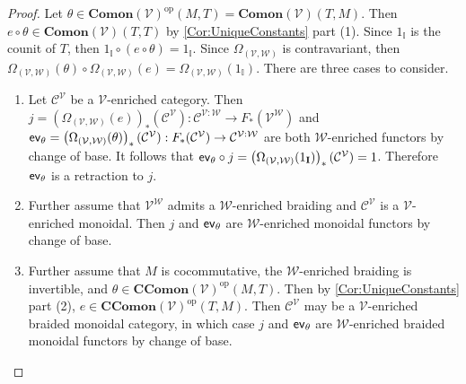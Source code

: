 \begin{proof}
    Let $\theta \in \mathbf{Comon}( \mathcal{V} )^{\text{op}}( M, T ) = \mathbf{Comon}( \mathcal{V} )( T, M )$.
    Then $e \circ \theta \in \mathbf{Comon}( \mathcal{V} )( T, T )$ by \cref{Cor:UniqueConstants} part (1).
    Since $1_{\mathbb{I}}$ is the counit of $T$, then $1_{\mathbb{I}} \circ ( e \circ \theta ) = 1_{\mathbb{I}}$.
    Since $\Omega_{(\mathcal{V},\mathcal{W})}$ is contravariant, then $\Omega_{(\mathcal{V},\mathcal{W})}( \theta ) \circ \Omega_{(\mathcal{V},\mathcal{W})}( e ) = \Omega_{(\mathcal{V},\mathcal{W})}( 1_{\mathbb{I}} )$.
    There are three cases to consider.
    \begin{enumerate}
    \item Let $\mathcal{C}^{\mathcal{V}}$ be a $\mathcal{V}$-enriched category.
          Then $j = \left( \Omega_{(\mathcal{V},\mathcal{W})}( e ) \right)_*( \mathcal{C}^{\mathcal{V}} ): \mathcal{C}^{\mathcal{V}:\mathcal{W}} \rightarrow F_*( \mathcal{V}^{\mathcal{W}} )$ and $\mathsf{ev}_\theta = \left( \Omega_{(\mathcal{V},\mathcal{W})}( \theta ) \right)_*( \mathcal{C}^{\mathcal{V}} ): F_*( \mathcal{C}^{\mathcal{V}} ) \to \mathcal{C}^{\mathcal{V}:\mathcal{W}}$ are both $\mathcal{W}$-enriched functors by change of base.
          It follows that $\mathsf{ev}_\theta \circ j = \left( \Omega_{(\mathcal{V},\mathcal{W})}( 1_{\mathbf{I}} ) \right)_*( \mathcal{C}^{\mathcal{V}} ) = 1$.
          Therefore $\mathsf{ev}_\theta$ is a retraction to $j$.
    \item Further assume that $\mathcal{V}^{\mathcal{W}}$ admits a $\mathcal{W}$-enriched braiding and $\mathcal{C}^{\mathcal{V}}$ is a $\mathcal{V}$-enriched monoidal.
          Then $j$ and $\mathsf{ev}_\theta$ are $\mathcal{W}$-enriched monoidal functors by change of base.
    \item Further assume that $M$ is cocommutative, the $\mathcal{W}$-enriched braiding is invertible, and $\theta \in \mathbf{CComon}( \mathcal{V} )^{\text{op}}( M, T )$.
          Then by \cref{Cor:UniqueConstants} part (2), $e \in \mathbf{CComon}( \mathcal{V} )^{\text{op}}( T, M )$.
          Then $\mathcal{C}^{\mathcal{V}}$ may be a $\mathcal{V}$-enriched braided monoidal category, in which case $j$ and $\mathsf{ev}_\theta$ are $\mathcal{W}$-enriched braided monoidal functors by change of base.
          \endproof
    \end{enumerate}
\end{proof}

